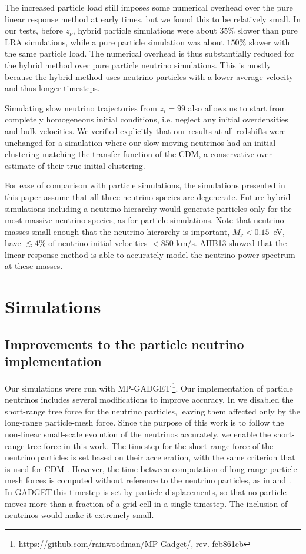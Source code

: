 \documentclass[useAMS, usenatbib]{mnras}
\newcommand{\gadget}{{\small GADGET\,}}
\begin{document}
The increased particle load still imposes some numerical overhead over the pure linear response method at early times, but we found this to be relatively small. In our tests, before $z_\nu$, hybrid particle simulations were about $35\%$ slower than pure LRA simulations, while a pure particle simulation was about $150\%$ slower with the same particle load.
The numerical overhead is thus substantially reduced for the hybrid method over pure particle neutrino simulations. This is mostly because the hybrid method uses neutrino particles with a lower average velocity and thus longer timesteps.

Simulating slow neutrino trajectories from $z_i = 99$ also allows us to start from completely homogeneous initial conditions, i.e. neglect any initial overdensities and bulk velocities. We verified explicitly that our results at all redshifts were unchanged for a simulation where our slow-moving neutrinos had an initial clustering matching the transfer function of the CDM, a conservative over-estimate of their true initial clustering.

For ease of comparison with particle simulations, the simulations presented in this paper assume that all three neutrino species are degenerate. Future hybrid simulations including a neutrino hierarchy would generate particles only for the most massive neutrino species, as for particle simulations. Note that neutrino masses small enough that the neutrino hierarchy is important, $M_\nu < 0.15$~eV, have $\lesssim 4$\% of neutrino initial velocities $< 850$ km/s. AHB13 showed that the linear response method is able to accurately model the neutrino power spectrum at these masses.

\section{Simulations} \label{sec:simulations}


\subsection{Improvements to the particle neutrino implementation}

Our simulations were run with MP-\gadget\footnote{\url{https://github.com/rainwoodman/MP-Gadget/}, rev. fcb861eb}. Our implementation of particle neutrinos includes several modifications to improve accuracy.
In \cite{Bird_2012} we disabled the short-range tree force for the neutrino particles, leaving them affected only by the long-range particle-mesh force. Since the purpose of this work is to follow the non-linear small-scale evolution of the neutrinos accurately, we enable the short-range tree force in this work. The timestep for the short-range force of the neutrino particles is set based on their acceleration, with the same criterion that is used for CDM \citep{Springel_2005}. However, the time between computation of long-range particle-mesh forces is computed without reference to the neutrino particles, as in \cite{Viel_2010} and \cite{Bird_2012}. In \gadget this timestep is set by particle displacements, so that no particle moves more than a fraction of a grid cell in a single timestep. The inclusion of neutrinos would make it extremely small.
\end{document}
